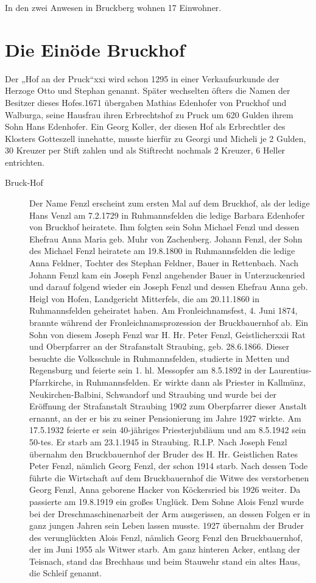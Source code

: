 \documentclass{book}
\begin{document}
In den zwei Anwesen in Bruckberg wohnen 17 Einwohner.

\section{Die Einöde Bruckhof}

Der „Hof an der Pruck“xxi wird schon 1295 in einer Verkaufsurkunde der Herzoge
Otto und Stephan genannt. Später wechselten öfters die Namen der Besitzer dieses
Hofes.1671 übergaben Mathias Edenhofer von Pruckhof und Walburga, seine Hausfrau
ihren Erbrechtshof zu Pruck um 620 Gulden ihrem Sohn Hans Edenhofer. Ein Georg
Koller, der diesen Hof als Erbrechtler des Klosters Gotteszell innehatte, musste
hierfür zu Georgi und Micheli je 2 Gulden, 30 Kreuzer per Stift zahlen und als
Stiftrecht nochmals 2 Kreuzer, 6 Heller entrichten.

\begin{description}
\item[Bruck-Hof] Der Name Fenzl erscheint zum ersten Mal auf dem Bruckhof, als
der ledige Hans Venzl am 7.2.1729 in Ruhmannsfelden die ledige Barbara Edenhofer
von Bruckhof heiratete. Ihm folgten sein Sohn Michael Fenzl und dessen Ehefrau
Anna Maria geb. Muhr von Zachenberg. Johann Fenzl, der Sohn des Michael Fenzl
heiratete am 19.8.1800 in Ruhmannsfelden die ledige Anna Feldner, Tochter des
Stephan Feldner, Bauer in Rettenbach. Nach Johann Fenzl kam ein Joseph Fenzl
angehender Bauer in Unterzuckenried und darauf folgend wieder ein Joseph Fenzl
und dessen Ehefrau Anna geb. Heigl von Hofen, Landgericht Mitterfels, die am
20.11.1860 in Ruhmannsfelden geheiratet haben. Am Fronleichnamsfest, 4. Juni
1874, brannte während der Fronleichnamsprozession der Bruckbauernhof ab. Ein
Sohn von diesem Joseph Fenzl war H. Hr. Peter Fenzl, Geistlicherxxii Rat und
Oberpfarrer an der Strafanstalt Straubing, geb. 28.6.1866. Dieser besuchte die
Volksschule in Ruhmannsfelden, studierte in Metten und Regensburg und feierte
sein 1. hl. Messopfer am 8.5.1892 in der Laurentius-Pfarrkirche, in
Ruhmannsfelden. Er wirkte dann als Priester in Kallmünz, Neukirchen-Balbini,
Schwandorf und Straubing und wurde bei der Eröffnung der Strafanstalt Straubing
1902 zum Oberpfarrer dieser Anstalt ernannt, an der er bis zu seiner
Pensionierung im Jahre 1927 wirkte. Am 17.5.1932 feierte er sein 40-jähriges
Priesterjubiläum und am 8.5.1942 sein 50-tes. Er starb am 23.1.1945 in
Straubing. R.I.P. Nach Joseph Fenzl übernahm den Bruckbauernhof der Bruder des
H. Hr. Geistlichen Rates Peter Fenzl, nämlich Georg Fenzl, der schon 1914 starb.
Nach dessen Tode führte die Wirtschaft auf dem Bruckbauernhof die Witwe des
verstorbenen Georg Fenzl, Anna geborene Hacker von Köckersried bis 1926 weiter.
Da passierte am 19.8.1919 ein großes Unglück. Dem Sohne Alois Fenzl wurde bei
der Dreschmaschinenarbeit der Arm ausgerissen, an dessen Folgen er in ganz
jungen Jahren sein Leben lassen musste. 1927 übernahm der Bruder des
verunglückten Alois Fenzl, nämlich Georg Fenzl den Bruckbauernhof, der im Juni
1955 als Witwer starb. Am ganz hinteren Acker, entlang der Teisnach, stand das
Brechhaus und beim Stauwehr stand ein altes Haus, die Schleif genannt.
\end{description}
\end{document}
